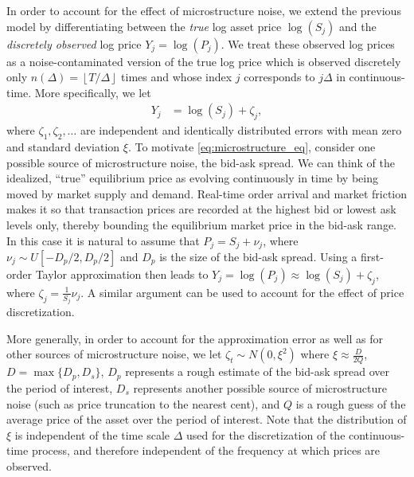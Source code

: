 In order to account for the effect of microstructure noise, we extend the previous model by differentiating between the \textit{true} log asset price $\log(S_j)$ and the \textit{discretely observed} log price $Y_j = \log(P_j)$. We treat these observed log prices as a noise-contaminated version of the true log price which is observed discretely only $n(\Delta) = \left\lfloor T/\Delta \right\rfloor$ times and whose index $j$ corresponds to $j\Delta$ in continuous-time.  More specifically, we let
\begin{align}\label{eq:microstructure_eq}
  Y_j &= \log (S_j) + \zeta_j,
\end{align}
where $\zeta_1, \zeta_2, \ldots$ are independent and identically distributed errors with mean zero and standard deviation $\xi$.  To motivate \eqref{eq:microstructure_eq}, consider one possible source of microstructure noise, the bid-ask spread. We can think of the idealized, ``true'' equilibrium price as evolving continuously in time by being moved by market supply and demand. Real-time order arrival and market friction makes it so that transaction prices are recorded at the highest bid or lowest ask levels only, thereby bounding the equilibrium market price in the bid-ask range. In this case it is natural to assume that $P_j = S_j + \nu_j$, where $\nu_j \sim U[ - D_p/2, D_p/2]$ and $D_p$ is the size of the bid-ask spread.  Using a first-order Taylor approximation then leads to $Y_j = \log(P_j) \approx \log(S_j) + \zeta_j$, where $\zeta_j = \frac{1}{S_j}\nu_j$.  A similar argument can be used to account for the effect of price discretization.

More generally, in order to account for the approximation error as well as for other sources of microstructure noise, we let $\zeta_t \sim N (0, \xi^2)$ where $\xi \approx \frac{D}{2Q}$, $D = \max\{ D_p, D_s\}$, $D_p$ represents a rough estimate of the bid-ask spread over the period of interest, $D_s$ represents another possible source of microstructure noise (such as price truncation to the nearest cent), and $Q$ is a rough guess of the average price of the asset over the period of interest.  Note that the distribution of $\xi$ is independent of the time scale $\Delta$ used for the discretization of the continuous-time process, and therefore independent of the frequency at which prices are observed.

